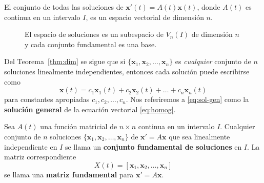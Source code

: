 \begin{theorem}\label{thm:dim}
El conjunto de todas las soluciones de $\mathbf{x}'(t) = A(t)\mathbf{x}(t)$, donde $A(t)$ es continua en un intervalo $I$, es un espacio vectorial de dimensi\'on $n$.
\end{theorem}

\begin{figure}[H]
\centering
{}
\caption{El espacio de soluciones es un subespacio de $V_n(I)$ de dimensi\'on $n$ y cada conjunto fundamental es una base.}
\label{fig:subespacio}
\end{figure}

Del Teorema~\ref{thm:dim} se sigue que si $\{\mathbf{x}_1, \mathbf{x}_2, \dots, \mathbf{x}_n\}$ es \textit{cualquier} conjunto de $n$ soluciones linealmente independientes, entonces cada soluci\'on puede escribirse como
\begin{equation}\label{eq:sol-gen}
    \mathbf{x}(t) = c_1\mathbf{x}_1(t) + c_2\mathbf{x}_2(t) + \dots + c_n\mathbf{x}_n(t)
\end{equation}
para constantes apropiadas $c_1, c_2, \dots, c_n$. Nos referiremos a \eqref{eq:sol-gen} como la \textbf{soluci\'on general} de la ecuaci\'on vectorial \eqref{eq:homog}.

\begin{definition}
Sea $A(t)$ una funci\'on matricial de $n \times n$ continua en un intervalo $I$. Cualquier conjunto de $n$ soluciones $\{\mathbf{x}_1, \mathbf{x}_2, \dots, \mathbf{x}_n\}$ de $\mathbf{x}' = A\mathbf{x}$ que sea linealmente independiente en $I$ se llama un \textbf{conjunto fundamental de soluciones} en $I$. La matriz correspondiente
\[
X(t) = [\mathbf{x}_1, \mathbf{x}_2, \dots, \mathbf{x}_n]
\]
se llama una \textbf{matriz fundamental} para $\mathbf{x}' = A\mathbf{x}$.
\end{definition}

